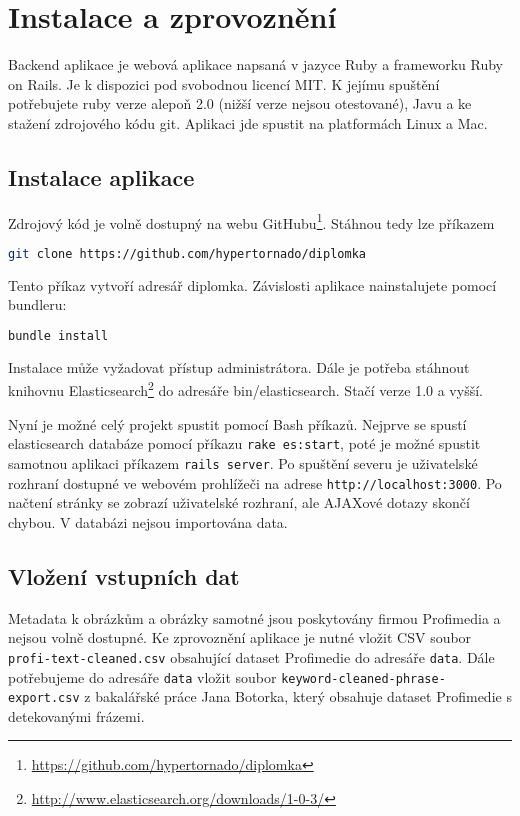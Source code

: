 \chapter{Instalace a zprovoznění}
\label{chap:implementace}

Backend aplikace je webová aplikace napsaná v jazyce Ruby a frameworku Ruby on Rails. Je k dispozici pod svobodnou licencí MIT. K jejímu spuštění potřebujete ruby verze alepoň 2.0 (nižší verze nejsou otestované), Javu a ke stažení zdrojového kódu git. Aplikaci jde spustit na platformách Linux a Mac.

\section{Instalace aplikace}

Zdrojový kód je volně dostupný na webu GitHubu\footnote{\url{https://github.com/hypertornado/diplomka}}. Stáhnou tedy lze příkazem

\begin{lstlisting}[language=bash]
git clone https://github.com/hypertornado/diplomka
\end{lstlisting}

Tento příkaz vytvoří adresář diplomka. Závislosti aplikace nainstalujete pomocí bundleru:

\begin{lstlisting}[language=bash]
bundle install
\end{lstlisting}

Instalace může vyžadovat přístup administrátora. Dále je potřeba stáhnout knihovnu Elasticsearch\footnote{\url{http://www.elasticsearch.org/downloads/1-0-3/}} do adresáře bin/elasticsearch. Stačí verze 1.0 a vyšší.

Nyní je možné celý projekt spustit pomocí Bash příkazů. Nejprve se spustí elasticsearch databáze pomocí příkazu \lstinline{rake es:start}, poté je možné spustit samotnou aplikaci příkazem \lstinline{rails server}. Po spuštění severu je uživatelské rozhraní dostupné ve webovém prohlížeči na adrese \lstinline{http://localhost:3000}. Po načtení stránky se zobrazí uživatelské rozhraní, ale AJAXové dotazy skončí chybou. V databázi nejsou importována data.

\section{Vložení vstupních dat}

Metadata k obrázkům a obrázky samotné jsou poskytovány firmou Profimedia a nejsou volně dostupné. Ke zprovoznění aplikace je nutné vložit CSV soubor \lstinline{profi-text-cleaned.csv} obsahující dataset Profimedie do adresáře \lstinline{data}. Dále potřebujeme do adresáře \lstinline{data} vložit soubor \lstinline{keyword-cleaned-phrase-export.csv} z bakalářské práce Jana Botorka, který obsahuje dataset Profimedie s detekovanými frázemi.


